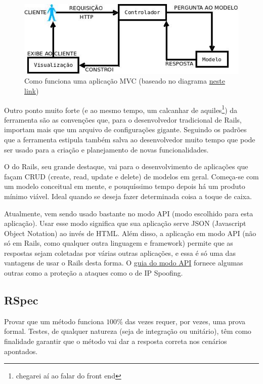 \begin{figure}[htb]
    \centering
    \includegraphics[width=.7\textwidth]{figuras/mvc.jpeg}
    \caption{Como funciona uma aplicação MVC (baseado no diagrama \href{https://blog.cloudboost.io/what-is-model-view-controller-124a9942246}{neste link})}
    \label{fig:mvc}
\end{figure}

Outro ponto muito forte (e ao mesmo tempo, um calcanhar de aquiles\footnote{chegarei aí ao falar
do front end}) da ferramenta são as convenções que, para o desenvolvedor tradicional de Rails,
importam mais que um arquivo de configurações gigante. Seguindo os padrões que a ferramenta estipula
também salva ao desenvolvedor muito tempo que pode ser usado para a criação e planejamento de novas
funcionalidades.

O  do Rails, seu grande destaque, vai para o desenvolvimento de aplicações que façam
CRUD (create, read, update e delete) de modelos em geral. Começa-se com um modelo conceitual em mente,
e pouquíssimo tempo depois há um produto mínimo viável. Ideal quando se deseja fazer determinada coisa
a toque de caixa.

Atualmente, vem sendo usado bastante no modo API (modo escolhido para esta aplicação). Usar esse
modo significa que sua aplicação serve JSON (Javascript Object Notation) ao invés de HTML. Além
disso, a aplicação em modo API (não só em Rails, como qualquer outra linguagem e framework) permite
que as respostas sejam coletadas por várias outras aplicações, e essa é só uma das vantagens de usar
o Rails desta forma. O \href{https://edgeguides.rubyonrails.org/api_app.html}{guia do modo API}
fornece algumas outras como a proteção a ataques como o de IP Spoofing.

\subsection{RSpec}
\label{subsec:rspec}

Provar que um método funciona $100\%$ das vezes requer, por vezes, uma prova
formal. Testes, de qualquer natureza (seja de integração ou unitário), têm como
finalidade garantir que o método vai dar a resposta correta nos cenários apontados.

